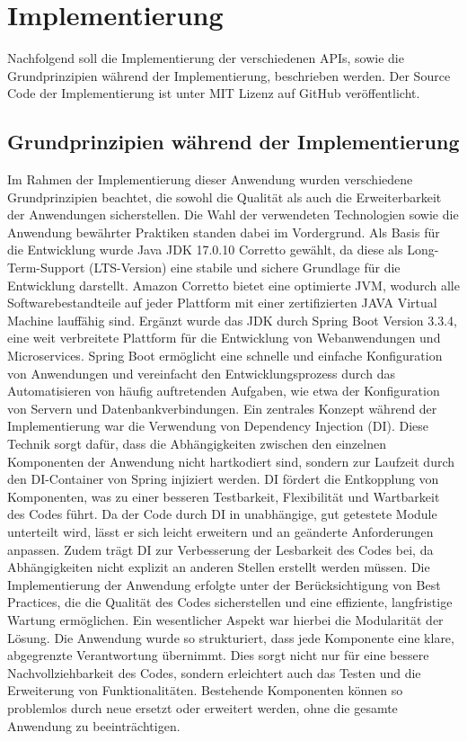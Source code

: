 \chapter{Implementierung} %
\label{sec:implementierung}
Nachfolgend soll die Implementierung der verschiedenen APIs, sowie die Grundprinzipien während der Implementierung, beschrieben werden. Der Source Code der Implementierung ist unter MIT Lizenz auf GitHub veröffentlicht. \citep{me}
\section{Grundprinzipien während der Implementierung} %
\label{sec:prinzipien}
Im Rahmen der Implementierung dieser Anwendung wurden verschiedene Grundprinzipien beachtet, die sowohl die Qualität als auch die Erweiterbarkeit der Anwendungen  sicherstellen. Die Wahl der verwendeten Technologien sowie die Anwendung bewährter Praktiken standen dabei im Vordergrund. Als Basis für die Entwicklung wurde Java JDK 17.0.10 Corretto gewählt, da diese als Long-Term-Support (LTS-Version) eine stabile und sichere Grundlage für die Entwicklung darstellt. Amazon Corretto bietet eine optimierte JVM, wodurch alle Softwarebestandteile auf jeder Plattform mit einer zertifizierten JAVA Virtual Machine lauffähig sind. Ergänzt wurde das JDK durch Spring Boot Version 3.3.4, eine weit verbreitete Plattform für die Entwicklung von Webanwendungen und Microservices. Spring Boot ermöglicht eine schnelle und einfache Konfiguration von Anwendungen und vereinfacht den Entwicklungsprozess durch das Automatisieren von häufig auftretenden Aufgaben, wie etwa der Konfiguration von Servern und Datenbankverbindungen.
\noindent
Ein zentrales Konzept während der Implementierung war die Verwendung von Dependency Injection (DI). Diese Technik sorgt dafür, dass die Abhängigkeiten zwischen den einzelnen Komponenten der Anwendung nicht hartkodiert sind, sondern zur Laufzeit durch den DI-Container von Spring injiziert werden. DI fördert die Entkopplung von Komponenten, was zu einer besseren Testbarkeit, Flexibilität und Wartbarkeit des Codes führt. Da der Code durch DI in unabhängige, gut getestete Module unterteilt wird, lässt er sich leicht erweitern und an geänderte Anforderungen anpassen. Zudem trägt DI zur Verbesserung der Lesbarkeit des Codes bei, da Abhängigkeiten nicht explizit an anderen Stellen erstellt werden müssen.
\noindent
Die Implementierung der Anwendung erfolgte unter der Berücksichtigung von Best Practices, die die Qualität des Codes sicherstellen und eine effiziente, langfristige Wartung ermöglichen. Ein wesentlicher Aspekt war hierbei die Modularität der Lösung. Die Anwendung wurde so strukturiert, dass jede Komponente eine klare, abgegrenzte Verantwortung übernimmt. Dies sorgt nicht nur für eine bessere Nachvollziehbarkeit des Codes, sondern erleichtert auch das Testen und die Erweiterung von Funktionalitäten. Bestehende Komponenten können so problemlos durch neue ersetzt oder erweitert werden, ohne die gesamte Anwendung zu beeinträchtigen.




